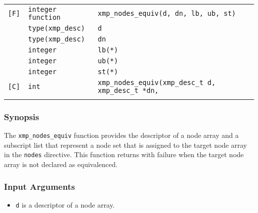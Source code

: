\begin{tabular}{lll}

\verb![F]!& {\tt integer function}& {\tt xmp\_nodes\_equiv(d, dn, lb,  ub, st)}\\
          & {\tt type(xmp\_desc)} & {\tt d}\\
          & {\tt type(xmp\_desc)} & {\tt dn}\\
          & {\tt integer}         & {\tt lb(*)}\\
          & {\tt integer}         & {\tt ub(*)}\\
          & {\tt integer}         & {\tt st(*)}\\

\verb![C]!&  {\tt int}& {\tt xmp\_nodes\_equiv(xmp\_desc\_t d, xmp\_desc\_t *dn,}\\
          &           & \hspace{3.1cm}{\tt int lb[], int ub[], int st[])}\\

\end{tabular}

\subsubsection*{Synopsis}

The {\tt xmp\_nodes\_equiv} function provides the descriptor of a node
array and a subscript list that represent a node set that is 
assigned to the target node array in the {\tt nodes} directive. This
function returns with failure when the target node array is not declared
as equivalenced.

\subsubsection*{Input Arguments}
\begin{itemize}
 \item {\tt d} is a descriptor of a node array.
\end{itemize}

